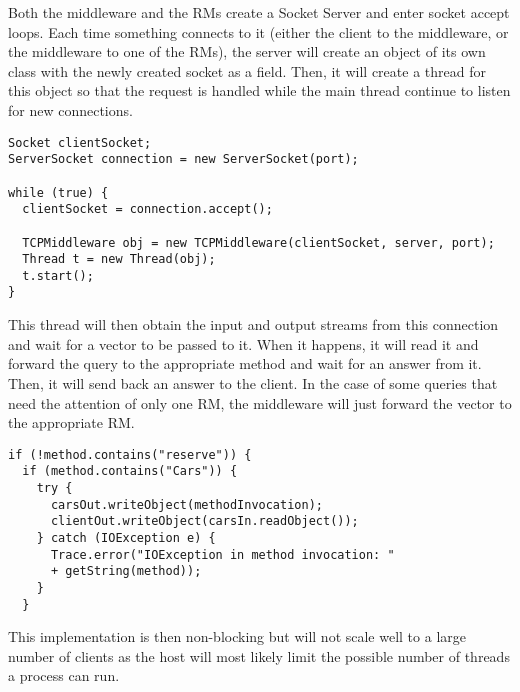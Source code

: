 \documentclass[12pt]{article}
\theoremstyle{plain}%
\theoremstyle{definition}
\theoremstyle{remark}
\begin{document}
Both the middleware and the RMs create a Socket Server and enter
socket accept loops. Each time something connects to it (either the
client to the middleware, or the middleware to one of the RMs), the
server will create an object of its own class with the newly created
socket as a field. Then, it will create a thread for this object so
that the request is handled while the main thread continue to listen
for new connections. 
\begin{lstlisting}
Socket clientSocket;
ServerSocket connection = new ServerSocket(port);

while (true) {
  clientSocket = connection.accept();
  
  TCPMiddleware obj = new TCPMiddleware(clientSocket, server, port);
  Thread t = new Thread(obj);
  t.start();
}
\end{lstlisting}
This thread will then obtain the input and output
streams from this connection and wait for a vector to be passed to
it. When it happens, it will read it and forward the query to the
appropriate method and wait for an answer from it. Then, it will send
back an answer to the client. In the case of some queries that need
the attention of only one RM, the middleware will just forward the
vector to the appropriate RM. 
\begin{lstlisting}
if (!method.contains("reserve")) {
  if (method.contains("Cars")) {
    try {
      carsOut.writeObject(methodInvocation);
      clientOut.writeObject(carsIn.readObject());
    } catch (IOException e) {
      Trace.error("IOException in method invocation: "
      + getString(method));
    }
  }
\end{lstlisting}
This implementation is then non-blocking but will
not scale well to a large number of clients as the host will
most likely limit the possible number of threads a process can run.
\end{document}
